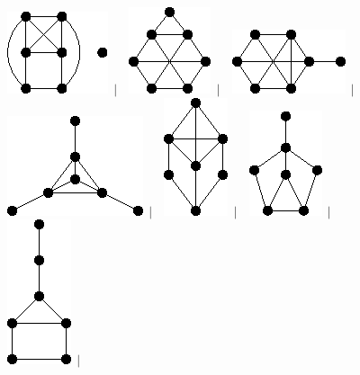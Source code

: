 \documentclass[11pt,paper=b5,footinclude,headinclude]{scrbook} %
\newtheorem{ex}{Vaja\hypertarget{sol:\theex}}[chapter]
\begin{document}
\begin{ex}
\begin{figure}
\includegraphics[scale=0.5]{smallGraphs/g_co-X100.png}$\,\mid\,$\
\includegraphics[scale=0.5]{smallGraphs/g_co-X101.png}$\,\mid\,$\
\includegraphics[scale=0.5]{smallGraphs/g_co-X102.png}$\,\mid\,$\
\includegraphics[scale=0.5]{smallGraphs/g_co-X103.png}$\,\mid\,$\
\includegraphics[scale=0.5]{smallGraphs/g_co-X104.png}$\,\mid\,$\
\includegraphics[scale=0.5]{smallGraphs/g_co-X105.png}$\,\mid\,$\
\includegraphics[scale=0.5]{smallGraphs/g_co-X106.png}$\,\mid\,$\

\end{figure}
\end{ex}
\end{document}
